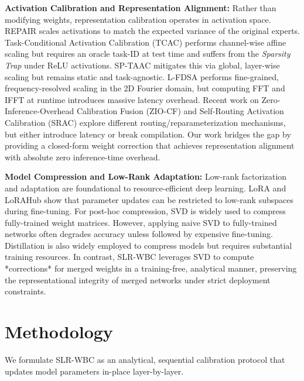 \documentclass{article}
\theoremstyle{plain}
\theoremstyle{definition}
\theoremstyle{remark}
\begin{document}
\textbf{Activation Calibration and Representation Alignment:} Rather than modifying weights, representation calibration operates in activation space. REPAIR \cite{jordan2023repair} scales activations to match the expected variance of the original experts. Task-Conditional Activation Calibration (TCAC) \cite{tcac2024} performs channel-wise affine scaling but requires an oracle task-ID at test time and suffers from the \textit{Sparsity Trap} under ReLU activations. SP-TAAC \cite{taac2023} mitigates this via global, layer-wise scaling but remains static and task-agnostic. L-FDSA \cite{fdsa2025} performs fine-grained, frequency-resolved scaling in the 2D Fourier domain, but computing FFT and IFFT at runtime introduces massive latency overhead. Recent work on Zero-Inference-Overhead Calibration Fusion (ZIO-CF) \cite{ziocf2024} and Self-Routing Activation Calibration (SRAC) \cite{srac2024} explore different routing/reparameterization mechanisms, but either introduce latency or break compilation. Our work bridges the gap by providing a closed-form weight correction that achieves representation alignment with absolute zero inference-time overhead.

\textbf{Model Compression and Low-Rank Adaptation:} Low-rank factorization and adaptation are foundational to resource-efficient deep learning. LoRA \cite{hu2021lora} and LoRAHub \cite{huang2024lorahub} show that parameter updates can be restricted to low-rank subspaces during fine-tuning. For post-hoc compression, SVD is widely used to compress fully-trained weight matrices. However, applying naive SVD to fully-trained networks often degrades accuracy unless followed by expensive fine-tuning. Distillation \cite{hinton2015distillation} is also widely employed to compress models but requires substantial training resources. In contrast, SLR-WBC leverages SVD to compute *corrections* for merged weights in a training-free, analytical manner, preserving the representational integrity of merged networks under strict deployment constraints.

\section{Methodology}
\label{sec:method}

We formulate SLR-WBC as an analytical, sequential calibration protocol that updates model parameters in-place layer-by-layer. 
\end{document}
